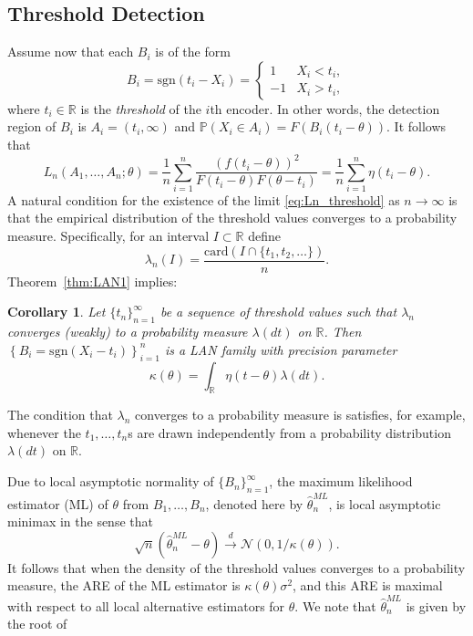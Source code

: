 \documentclass[letterpaper, 11pt]{IEEEtran}      %
\newtheorem{cor}[thm]{\bf {Corollary}}
\newcommand{\card}{\mathrm{card}}
\newcommand{\sgn}{\mathrm{sgn} }
\begin{document}
\subsection{Threshold Detection \label{subsec:threshold}}
Assume now that each $B_i$ is of the form
\begin{equation}
\label{eq:threshold_message}
B_i = \sgn(t_i - X_i) = \begin{cases} 1 & X_i< t_i, \\
-1 & X_i > t_i,
\end{cases}  
\end{equation}
where $t_i\in\mathbb R$ is the \emph{threshold} of the $i$th encoder. In other words, the detection region of $B_i$ is $A_i = (t_i,\infty)$ and $\mathbb P(X_i \in A_i) = F \left( B_i(t_i-\theta) \right)$. It follows that
\begin{equation}
L_n(A_1,\ldots,A_n;\theta) = \frac{1}{n} \sum_{i=1}^n \frac{ \left(f(t_i-\theta) \right)^2 }{F\left(t_i-\theta \right) F\left(\theta - t_i \right) }  = \frac{1}{n} \sum_{i=1}^n \eta(t_i - \theta).
\label{eq:Ln_threshold}
\end{equation}
A natural condition for the existence of the limit \eqref{eq:Ln_threshold} as $n\to \infty$ is that the empirical distribution of the threshold values converges to a probability measure. Specifically, for an interval $I \subset \mathbb R$ define
\[
\lambda_n(I) = \frac{ \card \left( I \cap \{t_1,t_2,\ldots \} \right)}{n}. 
\]
Theorem~\ref{thm:LAN1} implies:
\begin{cor} \label{cor:LAN_thresh}
Let $\{t_n\}_{n=1}^\infty$ be a sequence of threshold values such that $\lambda_n$ converges (weakly) to a probability measure $\lambda(dt)$ on $\mathbb R$. Then $\left\{ B_i = \sgn(X_i - t_i) \right\}_{i=1}^n$ is a LAN family with precision parameter
\[
\kappa(\theta) = \int_{\mathbb R} \eta(t-\theta) \lambda(dt). 
\]
\end{cor}
The condition that $\lambda_n$ converges to a probability measure is satisfies, for example, whenever the $t_1,\ldots,t_n$s are drawn independently from a probability distribution $\lambda(dt)$ on $\mathbb R$. \par
Due to local asymptotic normality of $\{B_n\}_{n=1}^\infty$, the maximum likelihood estimator (ML) of $\theta$ from $B_1,\ldots,B_n$, denoted here by 
$\hat{\theta}^{ML}_n$, is local asymptotic minimax in the sense that 
\[
\sqrt{n} \left( \hat{\theta}^{ML}_n - \theta \right) \overset{d}{\longrightarrow} \mathcal{N} \left(0, 1/\kappa(\theta) \right). 
\]
It follows that when the density of the threshold values converges to a probability measure, the ARE of the ML estimator is $\kappa(\theta)\sigma^2$, and this ARE is maximal with respect to all local alternative estimators for $\theta$. We note that $\hat{\theta}^{ML}_n$ is given by the root of 
\end{document}

